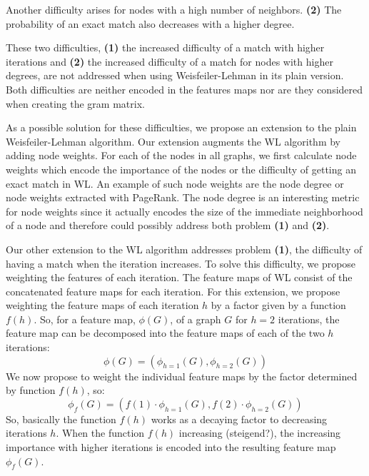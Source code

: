 Another difficulty arises for nodes with a high number of neighbors. \textbf{(2)} The probability of an exact match also decreases with a higher degree.

These two difficulties, \textbf{(1)} the increased difficulty of a match with higher iterations and \textbf{(2)} the increased difficulty of a match for nodes with higher degrees, are not addressed when using Weisfeiler-Lehman in its plain version. Both difficulties are neither encoded in the features maps nor are they considered when creating the gram matrix.

As a possible solution for these difficulties, we propose an extension to the plain Weisfeiler-Lehman algorithm.
Our extension augments the WL algorithm by adding node weights.
For each of the nodes in all graphs, we first calculate node weights which encode the importance of the nodes or the difficulty of getting an exact match in WL.
An example of such node weights are the node degree or node weights extracted with PageRank.
The node degree is an interesting metric for node weights since it actually encodes the size of the immediate neighborhood of a node and therefore could possibly address both problem \textbf{(1)} and \textbf{(2)}.


Our other extension to the WL algorithm addresses problem \textbf{(1)}, the difficulty of having a match when the iteration increases.
To solve this difficulty, we propose weighting the features of each iteration.
The feature maps of WL consist of the concatenated feature maps for each iteration.
For this extension, we propose weighting the feature maps of each iteration $h$ by a factor given by a function $f(h)$.
So, for a feature map, $\phi(G)$, of a graph $G$ for $h=2$ iterations, the feature map can be decomposed into the feature maps of each of the two $h$ iterations:
\begin{equation*}
\phi(G)=(\phi_{h=1}(G), \phi_{h=2}(G))
\end{equation*}
We now propose to weight the individual feature maps by the factor determined by function $f(h)$, so:
\begin{equation*}
\phi_{f}(G)=(f(1) \cdot \phi_{h=1}(G), f(2) \cdot \phi_{h=2}(G))
\end{equation*}
So, basically the function $f(h)$ works as a decaying factor to decreasing iterations $h$.
When the function $f(h)$ increasing (steigend?), the increasing importance with higher iterations is encoded into the resulting feature map $\phi_f(G)$.

